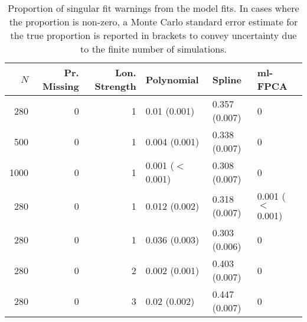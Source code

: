 \begin{table}[ht]
\centering
\begin{tabular}{rrrlll}
  \toprule
{\bfseries \small $N$} & {\bfseries \small Pr. Missing} & {\bfseries \small Lon. Strength} & {\bfseries \small Polynomial} & {\bfseries \small Spline} & {\bfseries \small ml-FPCA} \\ 
  \midrule
280 & 0 & 1 & 0.01 (0.001) & 0.357 (0.007) & 0 \\ 
  500 & 0 & 1 & 0.004 (0.001) & 0.338 (0.007) & 0 \\ 
  1000 & 0 & 1 & 0.001 ($<$ 0.001) & 0.308 (0.007) & 0 \\ 
  280 & 0 & 1 & 0.012 (0.002) & 0.318 (0.007) & 0.001 ($<$ 0.001) \\ 
  280 & 0 & 1 & 0.036 (0.003) & 0.303 (0.006) & 0 \\ 
  280 & 0 & 2 & 0.002 (0.001) & 0.403 (0.007) & 0 \\ 
  280 & 0 & 3 & 0.02 (0.002) & 0.447 (0.007) & 0 \\ 
   \bottomrule
\end{tabular}
\caption{Proportion of singular fit warnings from the model fits. In cases where the proportion is non-zero, a Monte Carlo standard error estimate for the true proportion is reported in brackets to convey uncertainty due to the finite number of simulations.} 
\label{tab:singularity-table}
\end{table}
